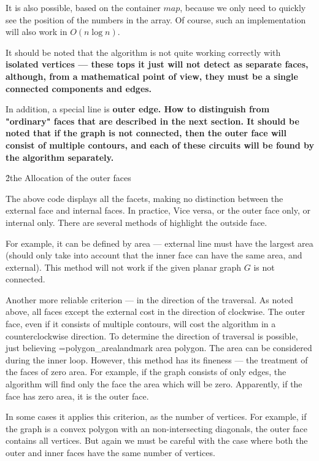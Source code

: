 It is also possible, based on the container $map$, because we only need to quickly see the position of the numbers in the array. Of course, such an implementation will also work in $O(n \log n)$.

It should be noted that the algorithm is not quite working correctly with \bf{isolated} vertices --- these tops it just will not detect as separate faces, although, from a mathematical point of view, they must be a single connected components and edges.

In addition, a special line is \bf{outer edge}. How to distinguish from "ordinary" faces that are described in the next section. It should be noted that if the graph is not connected, then the outer face will consist of multiple contours, and each of these circuits will be found by the algorithm separately.


\h2{the Allocation of the outer faces}

The above code displays all the facets, making no distinction between the external face and internal faces. In practice, Vice versa, or the outer face only, or internal only. There are several methods of highlight the outside face.

For example, it can be defined by area --- external line must have the largest area (should only take into account that the inner face can have the same area, and external). This method will not work if the given planar graph $G$ is not connected.

Another more reliable criterion --- in the direction of the traversal. As noted above, all faces except the external cost in the direction of clockwise. The outer face, even if it consists of multiple contours, will cost the algorithm in a counterclockwise direction. To determine the direction of traversal is possible, just believing \algohref=polygon_area{landmark area polygon}. The area can be considered during the inner loop. However, this method has its fineness --- the treatment of the faces of zero area. For example, if the graph consists of only edges, the algorithm will find only the face the area which will be zero. Apparently, if the face has zero area, it is the outer face.

In some cases it applies this criterion, as the number of vertices. For example, if the graph is a convex polygon with an non-intersecting diagonals, the outer face contains all vertices. But again we must be careful with the case where both the outer and inner faces have the same number of vertices.

